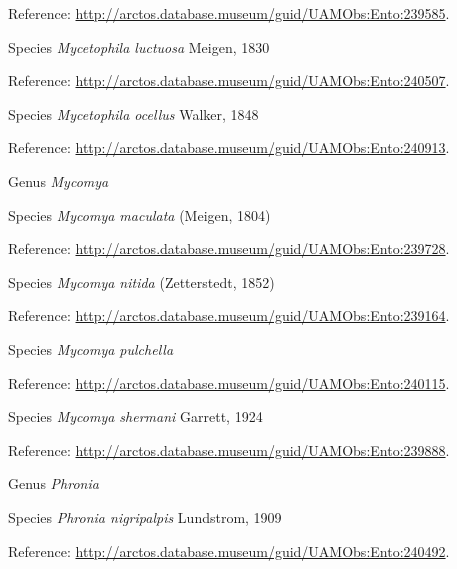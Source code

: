 \documentclass[9pt, article]{memoir}
\begin{document}
\begin{multicols}{2}
Reference: 
\url{http://arctos.database.museum/guid/UAMObs:Ento:239585}.

\vspace{6pt}\noindent\hspace{36pt}Species \textit{Mycetophila luctuosa} Meigen, 1830


Reference: 
\url{http://arctos.database.museum/guid/UAMObs:Ento:240507}.

\vspace{6pt}\noindent\hspace{36pt}Species \textit{Mycetophila ocellus} Walker, 1848


Reference: 
\url{http://arctos.database.museum/guid/UAMObs:Ento:240913}.

\vspace{6pt}\noindent\hspace{30pt}Genus \textit{Mycomya}


\vspace{6pt}\noindent\hspace{36pt}Species \textit{Mycomya maculata} (Meigen, 1804)


Reference: 
\url{http://arctos.database.museum/guid/UAMObs:Ento:239728}.

\vspace{6pt}\noindent\hspace{36pt}Species \textit{Mycomya nitida} (Zetterstedt, 1852)


Reference: 
\url{http://arctos.database.museum/guid/UAMObs:Ento:239164}.

\vspace{6pt}\noindent\hspace{36pt}Species \textit{Mycomya pulchella}


Reference: 
\url{http://arctos.database.museum/guid/UAMObs:Ento:240115}.

\vspace{6pt}\noindent\hspace{36pt}Species \textit{Mycomya shermani} Garrett, 1924


Reference: 
\url{http://arctos.database.museum/guid/UAMObs:Ento:239888}.

\vspace{6pt}\noindent\hspace{30pt}Genus \textit{Phronia}


\vspace{6pt}\noindent\hspace{36pt}Species \textit{Phronia nigripalpis} Lundstrom, 1909


Reference: 
\url{http://arctos.database.museum/guid/UAMObs:Ento:240492}.


\end{multicols}
\end{document}
